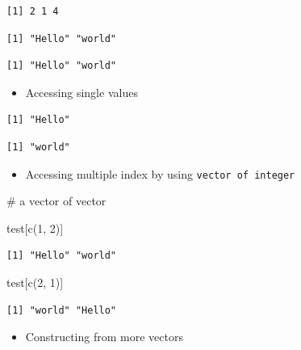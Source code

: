 \documentclass[
  letterpaper,
  DIV=11,
  numbers=noendperiod]{scrreprt}
\newenvironment{Shaded}{\begin{snugshade}}{\end{snugshade}}
\newcommand{\CommentTok}[1]{\textcolor[rgb]{0.37,0.37,0.37}{#1}}
\newcommand{\DecValTok}[1]{\textcolor[rgb]{0.68,0.00,0.00}{#1}}
\newcommand{\FunctionTok}[1]{\textcolor[rgb]{0.28,0.35,0.67}{#1}}
\newcommand{\NormalTok}[1]{\textcolor[rgb]{0.00,0.23,0.31}{#1}}
\providecommand{\tightlist}{%
  \setlength{\itemsep}{0pt}\setlength{\parskip}{0pt}}
\begin{document}
\begin{verbatim}
[1] 2 1 4
\end{verbatim}

\begin{verbatim}
[1] "Hello" "world"
\end{verbatim}

\begin{verbatim}
[1] "Hello" "world"
\end{verbatim}

\begin{itemize}
\tightlist
\item
  Accessing single values
\end{itemize}

\begin{verbatim}
[1] "Hello"
\end{verbatim}

\begin{verbatim}
[1] "world"
\end{verbatim}

\begin{itemize}
\tightlist
\item
  Accessing multiple index by using \texttt{vector\ of\ integer}
\end{itemize}

\begin{Shaded}
\begin{Highlighting}[]
\CommentTok{\# a vector of vector}

\NormalTok{test[}\FunctionTok{c}\NormalTok{(}\DecValTok{1}\NormalTok{, }\DecValTok{2}\NormalTok{)]}
\end{Highlighting}
\end{Shaded}

\begin{verbatim}
[1] "Hello" "world"
\end{verbatim}

\begin{Shaded}
\begin{Highlighting}[]
\NormalTok{test[}\FunctionTok{c}\NormalTok{(}\DecValTok{2}\NormalTok{, }\DecValTok{1}\NormalTok{)]}
\end{Highlighting}
\end{Shaded}

\begin{verbatim}
[1] "world" "Hello"
\end{verbatim}

\begin{itemize}
\tightlist
\item
  Constructing from more vectors
\end{itemize}
\end{document}
